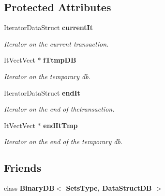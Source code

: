 \subsection*{Protected Attributes}
\begin{CompactItemize}
\item 
Iterator\-Data\-Struct {\bf current\-It}\label{class_it_binary_d_b_5885f783eeca530fa2f5d8f4ca772e7c}

\begin{CompactList}\small\item\em Iterator on the current transaction. \item\end{CompactList}\item 
It\-Vect\-Vect $\ast$ {\bf i\-Ttmp\-DB}\label{class_it_binary_d_b_768d3ac84d56e4c06c9d8aa72384dfd8}

\begin{CompactList}\small\item\em Iterator on the temporary db. \item\end{CompactList}\item 
Iterator\-Data\-Struct {\bf end\-It}\label{class_it_binary_d_b_5444ed214330550b28da30032caa76d4}

\begin{CompactList}\small\item\em Iterator on the end of thetransaction. \item\end{CompactList}\item 
It\-Vect\-Vect $\ast$ {\bf end\-It\-Tmp}\label{class_it_binary_d_b_99d05794ac53f0479a1dacd03dd74fc0}

\begin{CompactList}\small\item\em Iterator on the end of the temporary db. \item\end{CompactList}\end{CompactItemize}
\subsection*{Friends}
\begin{CompactItemize}
\item 
class {\bf Binary\-DB$<$ Sets\-Type, Data\-Struct\-DB $>$}\label{class_it_binary_d_b_040243f5590d2e87774acbc72e24382d}

\end{CompactItemize}


